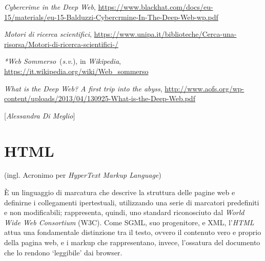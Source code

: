 {{{\emph{Cybercrime in the Deep Web},
\url{https://www.blackhat.com/docs/eu-15/materials/eu-15-Balduzzi-Cybercrmine-In-The-Deep-Web-wp.pdf}

\emph{Motori di ricerca scientifici},
\url{https://www.unipa.it/biblioteche/Cerca-una-risorsa/Motori-di-ricerca-scientifici-/}

\emph{*Web Sommerso}~(\emph{s.v}.), in \emph{Wikipedia},
\url{https://it.wikipedia.org/wiki/Web_sommerso}

\emph{What is the Deep Web? A first trip into the abyss},
\url{http://www.aofs.org/wp-content/uploads/2013/04/130925-What-is-the-Deep-Web.pdf}
}

\hrulefill 

{[}\emph{Alessandra Di Meglio}{]}



\chapter{HTML}

(ingl. Acronimo per \emph{HyperText Markup Language})

È un linguaggio di marcatura che descrive la struttura delle pagine web
e definirne i collegamenti ipertestuali, utilizzando una serie di
marcatori predefiniti e non modificabili; rappresenta, quindi, uno
standard riconosciuto dal \emph{World Wide Web Consortium} (W3C). Come
SGML, suo progenitore, e XML, l'\emph{HTML} attua una fondamentale
distinzione tra il testo, ovvero il contenuto vero e proprio della
pagina web, e i markup che rappresentano, invece, l'ossatura del
documento che lo rendono `leggibile' dai browser.

}}
